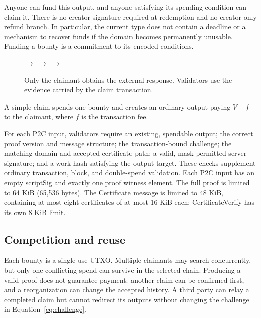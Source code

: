 \documentclass[11pt,a4paper]{article}
\begin{document}
Anyone can fund this output, and anyone satisfying its spending condition can
claim it. There is no creator signature required at redemption and no
creator-only refund branch. In particular, the current type does not contain
a deadline or a mechanism to recover funds if the domain becomes permanently
unusable. Funding a bounty is a commitment to its encoded conditions.

\begin{figure}[ht]
\centering
{}
$\longrightarrow$
$\longrightarrow$
$\longrightarrow$
\caption{Only the claimant obtains the external response. Validators use the
evidence carried by the claim transaction.}
\end{figure}

A simple claim spends one bounty and creates an ordinary output paying
$V-f$ to the claimant, where $f$ is the transaction fee.

\begin{samepage}
For each P2C input, validators require an existing, spendable output; the
correct proof version and message structure; the transaction-bound challenge;
the matching domain and accepted certificate path; a valid, mask-permitted server signature;
and a work hash satisfying the output target. These checks supplement ordinary
transaction, block, and double-spend validation. Each P2C input has an empty
scriptSig and exactly one proof witness element. The full proof is limited to
64 KiB (65,536 bytes). The Certificate message is
limited to 48 KiB, containing at most eight certificates of at most 16 KiB
each; CertificateVerify has its own 8 KiB limit.
\par
\end{samepage}

\subsection*{Competition and reuse}

Each bounty is a single-use UTXO. Multiple claimants may search concurrently,
but only one conflicting spend can survive in the selected chain. Producing
a valid proof does not guarantee payment: another claim can be confirmed
first, and a reorganization can change the accepted history. A third party
can relay a completed claim but cannot redirect its outputs without changing
the challenge in Equation~\eqref{eq:challenge}.
\end{document}
